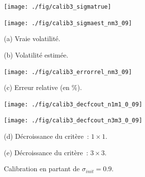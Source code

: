 \pagebreak

\begin{figure}[!htbp]

\begin{center}
\begin{minipage}{5.8cm}
\centerline{\texttt{[image: ./fig/calib3\_sigmatrue]}
} 
\end{minipage}
\hspace*{0.1cm}
\begin{minipage}{5.8cm}
\centerline{\texttt{[image: ./fig/calib3\_sigmaest\_nm3\_09]}
}
\end{minipage}
\end{center}

\begin{center}
\begin{minipage}{5.8cm}
(a) Vraie volatilit\'e.
\end{minipage}
\hspace*{0.1cm}
\begin{minipage}{5.8cm}
(b) Volatilit\'e estim\'ee.
\end{minipage}
\end{center}

\medskip

\begin{center}
\begin{minipage}{5.8cm}
\centerline{\texttt{[image: ./fig/calib3\_errorrel\_nm3\_09]}
}
\end{minipage}
\end{center}

\begin{center}
\begin{minipage}{5.8cm}
(c) Erreur relative (en \%).
\end{minipage}
\end{center}

\medskip

\begin{center}
\begin{minipage}{5.8cm}
\centerline{\texttt{[image: ./fig/calib3\_decfcout\_n1m1\_0\_09]}
}
\end{minipage}
\hspace*{0.1cm}
\begin{minipage}{5.8cm}
\centerline{\texttt{[image: ./fig/calib3\_decfcout\_n3m3\_0\_09]}
}
\end{minipage}
\end{center}

\begin{center}
\begin{minipage}{5.8cm}
(d) D\'ecroissance du crit\`ere~: $1 \times 1$.
\end{minipage}
\hspace*{0.1cm}
\begin{minipage}{5.8cm}
(e) D\'ecroissance du crit\`ere~: $3 \times 3$.
\end{minipage}
\end{center}

\caption{Calibration en partant de $\sigma_{init} = 0.9$.}
\label{FIG:CALIB3_NM3_09}
\end{figure}

